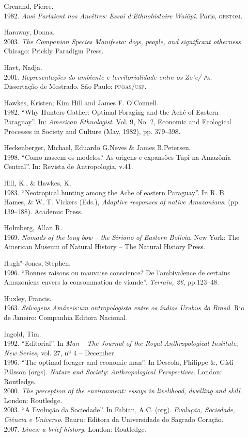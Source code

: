 \begin{bibliohedra}
Grenand, Pierre.\\
1982. \emph{Ansi Parlaient nos Ancêtres: Essai d'Ethnohistoire
Waiãpi}. Paris, \textsc{orstom}.

Haraway, Donna.\\
2003. \emph{The Companion Species Manifesto: dogs, people, and
significant otherness.} Chicago: Prickly Paradigm Press.

Havt, Nadja.\\
2001. \emph{Representações do ambiente e territorialidade entre
os Zo'e/ \textsc{pa}}. Dissertação de Mestrado. São Paulo: \textsc{ppgas}/\textsc{usp}.

Hawkes, Kristen; Kim Hill and James F. O'Connell.\\
1982. ``Why Hunters Gather: Optimal Foraging and the Aché of
Eastern Paraguay''. In: \emph{American Ethnologist}. Vol. 9, No. 2,
Economic and Ecological Processes in Society and Culture (May, 1982),
pp. 379--398.

Heckenberger, Michael, Eduardo G.Neves \& James B.Petersen.\\
1998. ``Como nascem os modelos? As origens e expansões Tupi na
Amazônia Central''. In: Revista de Antropologia, v.41.

Hill, K., \& Hawkes, K.\\
1983. ``Neotropical hunting among the Ache of eastern
Paraguay''. In R. B. Hames, \& W. T. Vickers (Eds.), \emph{Adaptive
responses of native Amazonians}. (pp. 139--188). Academic Press.

Holmberg, Allan R.\\
1969. \emph{Nomads of the long bow -- the Siriono of Eastern
Bolivia}. New York: The American Museum of Natural History -- The
Natural History Press.

Hugh"-Jones, Stephen.\\
1996. ``Bonnes raisons ou mauvaise conscience? De l'ambivalence
de certains Amazoniens envers la consommation de viande''. \emph{Terrain,
26}, pp.123--48.

Huxley, Francis.\\
1963. \emph{Selvagens Amáveis:um antropologista entre os índios
Urubus do Brasil}. Rio de Janeiro: Companhia Editora Nacional.

Ingold, Tim.\\
1992. ``Editorial''. In \emph{Man} -- \emph{The Journal of the
Royal Anthropological Institute}, \emph{New Series}, vol. 27, nº 4 --
December.\\
1996. ``The optimal forager and economic man''. In Descola,
Philippe \&, Gísli Pálsson (orgs). \emph{Nature and Society}:
\emph{Anthropological Perspectives}. London: Routledge.\\
2000. \emph{The perception of the environment: essays in
livelihood, dwelling and skill}. London: Routledge.\\
2003. ``A Evolução da Sociedade''. In Fabian, A.C. (org).
\emph{Evolução, Sociedade, Ciência e Universo}. Bauru: Editora da
Universidade do Sagrado Coração.\\
2007. \emph{Lines: a brief history}. London: Routledge.


\end{bibliohedra}
